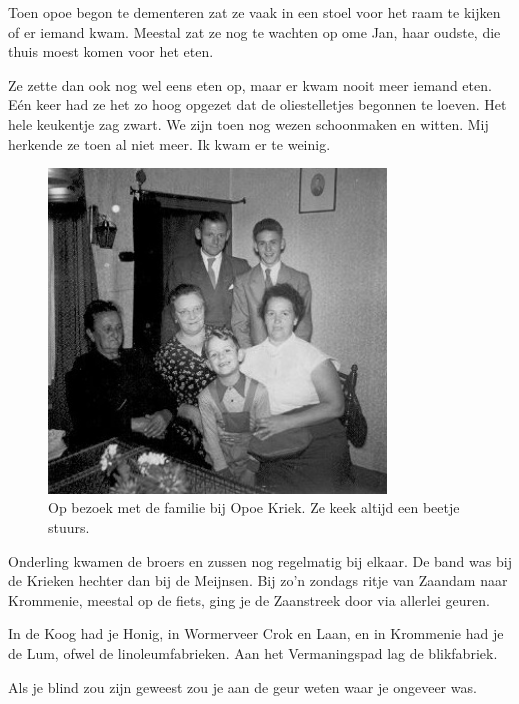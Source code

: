 \documentclass[12pt,twoside, openright]{memoir}
\begin{document}
Toen opoe begon te dementeren zat ze vaak in een stoel voor het raam te kijken of er iemand kwam. Meestal zat ze nog te wachten op ome Jan, haar oudste, die thuis moest komen voor het eten. 

Ze zette dan ook nog wel eens eten op, maar er kwam nooit meer iemand eten. Eén keer had ze het zo hoog opgezet dat de oliestelletjes begonnen te loeven. Het hele keukentje zag zwart. We zijn toen nog wezen schoonmaken en witten. Mij herkende ze toen al niet meer. Ik kwam er te weinig.

\begin{figure}
\centering
\includegraphics[width=0.8\textwidth]{img/ch3/opbezoek}
\caption*{\footnotesize Op bezoek met de familie bij Opoe Kriek. Ze keek altijd een beetje stuurs.}
\end{figure}

Onderling kwamen de broers en zussen nog regelmatig bij elkaar. De band was bij de Krieken hechter dan bij de Meijnsen. Bij zo’n zondags ritje van Zaandam naar Krommenie, meestal op de fiets, ging je de Zaanstreek door via allerlei geuren. 

In de Koog had je Honig, in Wormerveer Crok en Laan, en in Krommenie had je de Lum, ofwel de linoleumfabrieken. Aan het Vermaningspad lag de blikfabriek. 

Als je blind zou zijn geweest zou je aan de geur weten waar je ongeveer was. 
\end{document}

